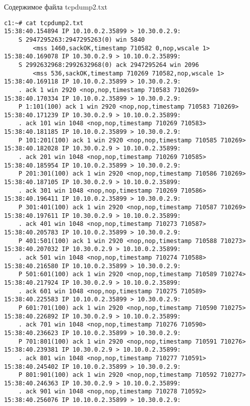 \documentclass[a4paper,12pt]{article}
\begin{document}
Содержимое файла tcpdump2.txt
\begin{Verbatim} 
c1:~# cat tcpdump2.txt 
15:38:40.154894 IP 10.10.0.2.35899 > 10.30.0.2.9: 
    S 2947295263:2947295263(0) win 5840 
        <mss 1460,sackOK,timestamp 710582 0,nop,wscale 1>
15:38:40.169078 IP 10.30.0.2.9 > 10.10.0.2.35899: 
    S 2992632968:2992632968(0) ack 2947295264 win 2096 
        <mss 536,sackOK,timestamp 710269 710582,nop,wscale 1>
15:38:40.169118 IP 10.10.0.2.35899 > 10.30.0.2.9: 
    . ack 1 win 2920 <nop,nop,timestamp 710583 710269>
15:38:40.170334 IP 10.10.0.2.35899 > 10.30.0.2.9: 
    P 1:101(100) ack 1 win 2920 <nop,nop,timestamp 710583 710269>
15:38:40.171239 IP 10.30.0.2.9 > 10.10.0.2.35899: 
    . ack 101 win 1048 <nop,nop,timestamp 710269 710583>
15:38:40.181185 IP 10.10.0.2.35899 > 10.30.0.2.9: 
    P 101:201(100) ack 1 win 2920 <nop,nop,timestamp 710585 710269>
15:38:40.182028 IP 10.30.0.2.9 > 10.10.0.2.35899: 
    . ack 201 win 1048 <nop,nop,timestamp 710269 710585>
15:38:40.185954 IP 10.10.0.2.35899 > 10.30.0.2.9: 
    P 201:301(100) ack 1 win 2920 <nop,nop,timestamp 710586 710269>
15:38:40.187105 IP 10.30.0.2.9 > 10.10.0.2.35899: 
    . ack 301 win 1048 <nop,nop,timestamp 710269 710586>
15:38:40.196411 IP 10.10.0.2.35899 > 10.30.0.2.9: 
    P 301:401(100) ack 1 win 2920 <nop,nop,timestamp 710587 710269>
15:38:40.197611 IP 10.30.0.2.9 > 10.10.0.2.35899: 
    . ack 401 win 1048 <nop,nop,timestamp 710273 710587>
15:38:40.205783 IP 10.10.0.2.35899 > 10.30.0.2.9: 
    P 401:501(100) ack 1 win 2920 <nop,nop,timestamp 710588 710273>
15:38:40.207032 IP 10.30.0.2.9 > 10.10.0.2.35899: 
    . ack 501 win 1048 <nop,nop,timestamp 710274 710588>
15:38:40.216580 IP 10.10.0.2.35899 > 10.30.0.2.9: 
    P 501:601(100) ack 1 win 2920 <nop,nop,timestamp 710589 710274>
15:38:40.217924 IP 10.30.0.2.9 > 10.10.0.2.35899: 
    . ack 601 win 1048 <nop,nop,timestamp 710275 710589>
15:38:40.225583 IP 10.10.0.2.35899 > 10.30.0.2.9: 
    P 601:701(100) ack 1 win 2920 <nop,nop,timestamp 710590 710275>
15:38:40.226892 IP 10.30.0.2.9 > 10.10.0.2.35899: 
    . ack 701 win 1048 <nop,nop,timestamp 710276 710590>
15:38:40.236623 IP 10.10.0.2.35899 > 10.30.0.2.9: 
    P 701:801(100) ack 1 win 2920 <nop,nop,timestamp 710591 710276>
15:38:40.239381 IP 10.30.0.2.9 > 10.10.0.2.35899: 
    . ack 801 win 1048 <nop,nop,timestamp 710277 710591>
15:38:40.245402 IP 10.10.0.2.35899 > 10.30.0.2.9: 
    P 801:901(100) ack 1 win 2920 <nop,nop,timestamp 710592 710277>
15:38:40.246363 IP 10.30.0.2.9 > 10.10.0.2.35899: 
    . ack 901 win 1048 <nop,nop,timestamp 710278 710592>
15:38:40.256076 IP 10.10.0.2.35899 > 10.30.0.2.9: 

\end{Verbatim}
\end{document}
